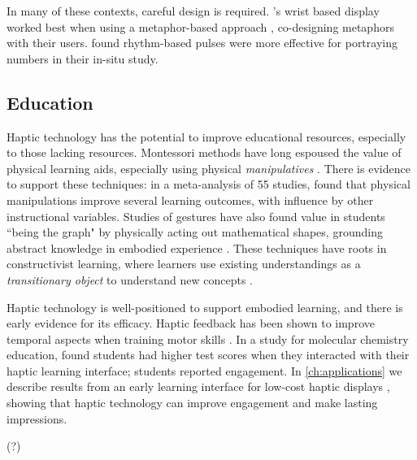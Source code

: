 In many of these contexts, careful design is required.
 \citet{Arab2015}'s wrist based display worked best when using a metaphor-based approach \cite{Brunet2013a}, co-designing metaphors with their users.
 \citet{Cauchard2016} found rhythm-based pulses were more effective for portraying numbers in their in-situ study.




\subsection{Education}
Haptic technology has the potential to improve educational resources, especially to those lacking resources.
Montessori methods have long espoused the value of physical learning aids, especially using physical \emph{manipulatives} \cite{Montessori1917}.
There is evidence to support these techniques: in a meta-analysis of 55 studies, \citet{Carbonneau2013} found that physical manipulations improve several learning outcomes, with influence by other instructional variables.
Studies of gestures have also found value in students ``being the graph" by physically acting out mathematical shapes, grounding abstract knowledge in embodied experience \cite{Gerofsky2010}.
These techniques have roots in constructivist learning, where learners use existing understandings as a \emph{transitionary object} to understand new concepts \cite{Papert1980}.

Haptic technology is well-positioned to support embodied learning, and there is early evidence for its efficacy.
Haptic feedback has been shown to improve temporal aspects when training motor skills \cite{Feygin2002}.
In a study for molecular chemistry education, \citet{Sato2008} found students had higher test scores when they interacted with their haptic learning interface; students reported engagement.
In \autoref{ch:applications} we describe results from an early learning interface for low-cost haptic displays \cite{Martinez2016}, showing that haptic technology can improve engagement and make lasting impressions.

\cite{Hook2008bodyemotion} (?)


